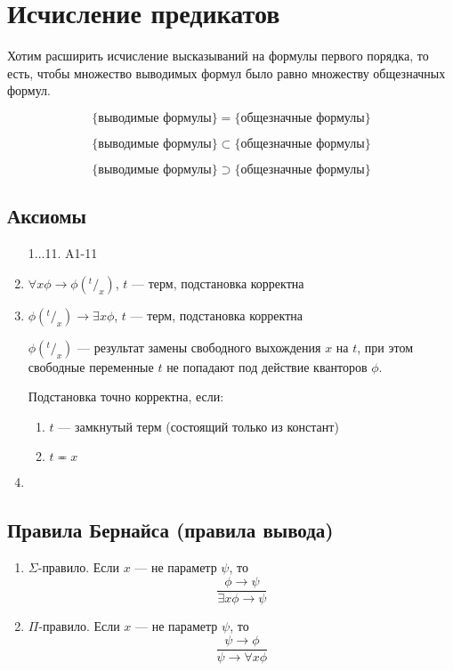 
\section{Исчисление предикатов}
Хотим расширить исчисление высказываний на формулы первого порядка, то есть, чтобы множество выводимых формул было равно множеству общезначных формул.

$$\{\text{выводимые формулы}\} = \{\text{общезначные формулы}\}$$
\begin{theorem}
    $$\{\text{выводимые формулы}\} \subset \{\text{общезначные формулы}\}$$
\end{theorem}
\begin{theorem}
    $$\{\text{выводимые формулы}\} \supset \{\text{общезначные формулы}\}$$
\end{theorem}

\subsection{Аксиомы}
\begin{enumerate}
    \item[1...11.] A1-11
    \setcounter{enumi}{11}
    \item $\forall x \phi \rightarrow \phi(^t/_x)$, $t$ --- терм, подстановка корректна
    \item $\phi(^t/_x) \rightarrow \exists x \phi$, $t$ --- терм, подстановка корректна

    $\phi(^t/_x)$ --- результат замены свободного выхождения $x$ на $t$, при этом свободные переменные \(t\) не попадают под действие кванторов $\phi$.

    Подстановка точно корректна, если:
    \begin{enumerate}
        \item $t$ --- замкнутый терм (состоящий только из констант)
        \item $t \eqcirc x$
    \end{enumerate}

    \item
\end{enumerate}

\subsection{Правила Бернайса (правила вывода)}
\begin{enumerate}
    \item $\Sigma$-правило. Если $x$ --- не параметр $\psi$, то
    $$\frac{\phi \rightarrow \psi}{\exists x \phi \rightarrow \psi}$$
    \item $\Pi$-правило. Если $x$ --- не параметр $\psi$, то
    $$\frac{\psi \rightarrow \phi}{\psi \rightarrow \forall x \phi}$$
\end{enumerate}

